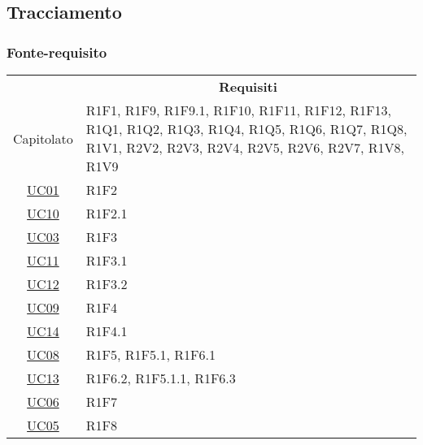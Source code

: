 \subsection{Tracciamento}
\subsubsection{Fonte-requisito}
\begin{table}[H]
    \centering
    \renewcommand{\arraystretch}{1.8}
        \begin{tabular}{c | p{6cm} }
            \rowcolor[HTML]{a52a2a}
            \multicolumn{1}{c}{\color[HTML]{FFFFFF} \textbf{Fonte}}          &
            \multicolumn{1}{c}{\color[HTML]{FFFFFF} \textbf{Requisiti}}
            \\

    Capitolato & R1F1, R1F9, R1F9.1, R1F10, R1F11, R1F12, R1F13, R1Q1, R1Q2, R1Q3, R1Q4, R1Q5, R1Q6, R1Q7, R1Q8, R1V1, R2V2, R2V3, R2V4, R2V5, R2V6, R2V7, R1V8, R1V9  \\
    \hyperref[UC01]{UC01} & R1F2 \\
    \hyperref[UC10]{UC10} & R1F2.1 \\
    \hyperref[UC03]{UC03} & R1F3 \\
    \hyperref[UC11]{UC11} & R1F3.1 \\
    \hyperref[UC12]{UC12} & R1F3.2 \\
    \hyperref[UC09]{UC09} & R1F4 \\
    \hyperref[UC14]{UC14} & R1F4.1 \\
    \hyperref[UC08]{UC08} & R1F5, R1F5.1, R1F6.1 \\
    \hyperref[UC13]{UC13} & R1F6.2, R1F5.1.1, R1F6.3 \\
    \hyperref[UC06]{UC06} & R1F7 \\
    \hyperref[UC05]{UC05} & R1F8 \\
    \end{tabular}
\end{table}

